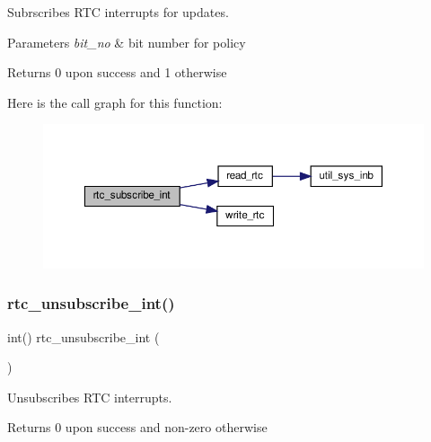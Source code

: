 Subrscribes R\+TC interrupts for updates. 


\begin{DoxyParams}{Parameters}
{\em bit\+\_\+no} & bit number for policy \\
\hline
\end{DoxyParams}
\begin{DoxyReturn}{Returns}
0 upon success and 1 otherwise 
\end{DoxyReturn}
Here is the call graph for this function\+:\nopagebreak
\begin{figure}[H]
\begin{center}
\leavevmode
\includegraphics[width=350pt]{group__RealTimeClock_ga5171a9c0f54940fe60f7500896afcc86_cgraph}
\end{center}
\end{figure}
\mbox{\label{group__RealTimeClock_ga9d4850bb2a488644672d43287f160622}} 
\subsubsection{\texorpdfstring{rtc\+\_\+unsubscribe\+\_\+int()}{rtc\_unsubscribe\_int()}}
{\footnotesize\ttfamily int() rtc\+\_\+unsubscribe\+\_\+int (\begin{DoxyParamCaption}{ }\end{DoxyParamCaption})}



Unsubscribes R\+TC interrupts. 

\begin{DoxyReturn}{Returns}
0 upon success and non-\/zero otherwise 
\end{DoxyReturn}
\mbox{\label{group__RealTimeClock_gab680718c3cc588942fae4b697a99a7a3}} 
